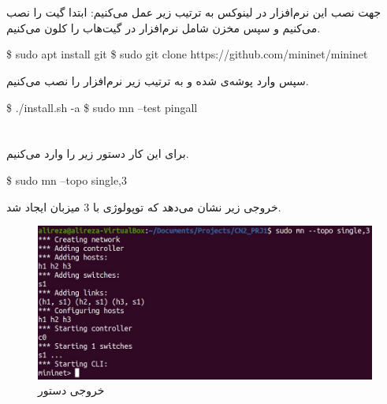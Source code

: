 \documentclass{article}
\begin{document}


\newpage


\section{}
جهت نصب این نرم‌افزار در لینوکس به ترتیب زیر عمل می‌کنیم:
\newline
ابتدا گیت را نصب می‌کنیم و سپس مخزن شامل نرم‌افزار در گیت‌هاب را کلون می‌کنیم.
\begin{latin}
\$ sudo apt install git
\newline
\$ sudo git clone https://github.com/mininet/mininet
\end{latin}
سپس وارد پوشه‌ی  شده و به ترتیب زیر نرم‌افزار را نصب می‌کنیم.
\begin{latin}
\$ ./install.sh -a
\newline
\$ sudo mn --test pingall
\end{latin}

\section{}
برای این کار دستور زیر را وارد می‌کنیم.
\begin{latin}
\$ sudo mn --topo single,3
\end{latin}
خروجی زیر نشان می‌دهد که توپولوژی  با 3 میزبان ایجاد شد.
\begin{figure}[H]
    \centering
    \includegraphics[width=1.0\textwidth]{figures/2a.jpg}
    \caption
	{
خروجی دستور 
	}
    \label{fig:fig1}
\end{figure}
\end{document}
